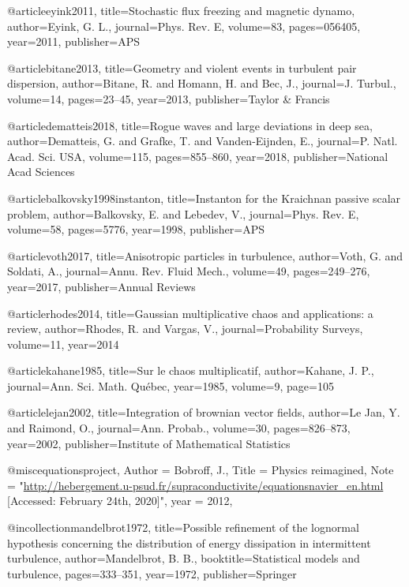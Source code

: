 @article{eyink2011,
  title={Stochastic flux freezing and magnetic dynamo},
  author={Eyink, G. L.},
  journal={Phys. Rev. E},
  volume={83},
  pages={056405},
  year={2011},
  publisher={APS}
}

@article{bitane2013,
  title={Geometry and violent events in turbulent pair dispersion},
  author={Bitane, R. and Homann, H. and Bec, J.},
  journal={J. Turbul.},
  volume={14},
  pages={23--45},
  year={2013},
  publisher={Taylor \& Francis}
}

@article{dematteis2018,
  title={Rogue waves and large deviations in deep sea},
  author={Dematteis, G. and Grafke, T. and Vanden-Eijnden, E.},
  journal={P. Natl. Acad. Sci. USA},
  volume={115},
  pages={855--860},
  year={2018},
  publisher={National Acad Sciences}
}

@article{balkovsky1998instanton,
  title={{Instanton for the Kraichnan passive scalar problem}},
  author={Balkovsky, E. and Lebedev, V.},
  journal={Phys. Rev. E},
  volume={58},
  pages={5776},
  year={1998},
  publisher={APS}
}

@article{voth2017,
  title={Anisotropic particles in turbulence},
  author={Voth, G. and Soldati, A.},
  journal={Annu. Rev. Fluid Mech.},
  volume={49},
  pages={249--276},
  year={2017},
  publisher={Annual Reviews}
}

@article{rhodes2014,
  title={Gaussian multiplicative chaos and applications: a review},
  author={Rhodes, R. and Vargas, V.},
  journal={Probability Surveys},
  volume={11},
  year={2014}
}

@article{kahane1985,
  title={{Sur le chaos multiplicatif}},
  author={Kahane, J. P.},
  journal={Ann. Sci. Math. Québec},
  year={1985},
  volume={9},
  page={105}
}

@article{lejan2002,
  title={Integration of brownian vector fields},
  author={Le Jan, Y. and Raimond, O.},
  journal={Ann. Probab.},
  volume={30},
  pages={826--873},
  year={2002},
  publisher={Institute of Mathematical Statistics}
}

@misc{equationsproject,
  Author = {Bobroff, J.},
  Title  = {Physics reimagined},
  Note   = "\url{http://hebergement.u-psud.fr/supraconductivite/equationsnavier_en.html} [Accessed: February 24th, 2020]",
  year = {2012},
}


@incollection{mandelbrot1972,
  title={{Possible refinement of the lognormal hypothesis concerning the distribution of energy dissipation in intermittent turbulence}},
  author={Mandelbrot, B. B.},
  booktitle={Statistical models and turbulence},
  pages={333--351},
  year={1972},
  publisher={Springer}
}

